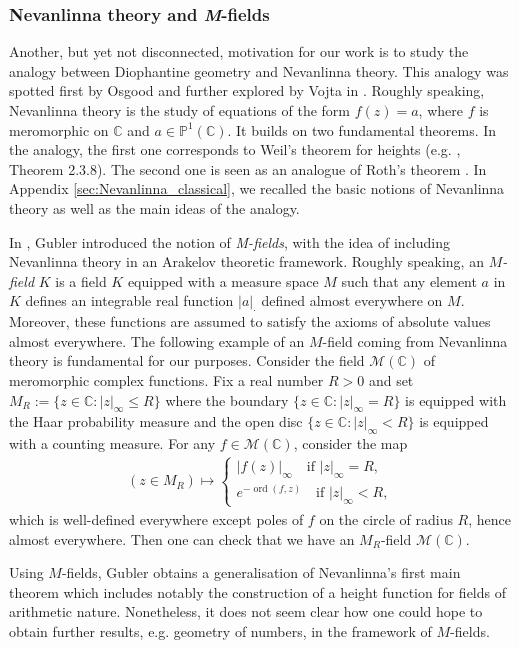 \documentclass [11pt,reqno]{amsart}
\def\bC{{\mathbb{C}}}
\newcommand{\1}{\mathmybb{1}}
\def\cM{{\mathcal{M}}}
\def\ord{\operatorname{ord}}
\begin{document}
\subsubsection*{Nevanlinna theory and \emph{M}-fields}

Another, but yet not disconnected, motivation for our work is to study the analogy between Diophantine geometry and Nevanlinna theory. This analogy was spotted first by Osgood \cite{Osgood81} and further explored by Vojta in \cite{Vojta87}. Roughly speaking, Nevanlinna theory is the study of equations of the form $f(z)=a$, where $f$ is meromorphic on $\bC$ and $a\in \mathbb{P}^{1}(\bC)$. It builds on two fundamental theorems. In the analogy, the first one corresponds to Weil's theorem for heights (e.g. \cite{BombieriGubler}, Theorem 2.3.8). The second one is seen as an analogue of Roth's theorem \cite{Roth55}. In Appendix \ref{sec:Nevanlinna_classical}, we recalled the basic notions of Nevanlinna theory as well as the main ideas of the analogy.

In \cite{Gubler97}, Gubler introduced the notion of \emph{M-fields}, with the idea of including Nevanlinna theory in an Arakelov theoretic framework. Roughly speaking, an $M$\emph{-field} $K$ is a field $K$ equipped with a measure space $M$ such that any element $a$ in $K$ defines an integrable real function $|a|_{\cdot}$ defined almost everywhere on $M$. Moreover, these functions are assumed to satisfy the axioms of absolute values almost everywhere. The following example of an $M$-field coming from Nevanlinna theory is fundamental for our purposes. Consider the field $\cM(\bC)$ of meromorphic complex functions. Fix a real number $R>0$ and set $M_R:=\{z\in \bC : |z|_{\infty}\leq R\}$ where the boundary $\{z\in \bC: |z|_{\infty}=R\}$ is equipped with the Haar probability measure and the open disc $\{z\in \bC: |z|_{\infty}<R\}$ is equipped with a counting measure. For any $f\in \cM(\bC)$, consider the map
\begin{align*}
(z\in M_R)\mapsto\left\{\begin{matrix}
|f(z)|_{\infty}\quad\text{if }|z|_{\infty}=R, \\
e^{-\ord(f,z)}\quad\text{if }|z|_{\infty}<R,
\end{matrix}\right.
\end{align*}
which is well-defined everywhere except poles of $f$ on the circle of radius $R$, hence almost everywhere. Then one can check that we have an $M_R$-field $\cM(\bC)$.

Using $M$-fields, Gubler obtains a generalisation of Nevanlinna's first main theorem which includes notably the construction of a height function for fields of arithmetic nature. Nonetheless, it does not seem clear how one could hope to obtain further results, e.g. geometry of numbers, in the framework of $M$-fields. 
\end{document}
